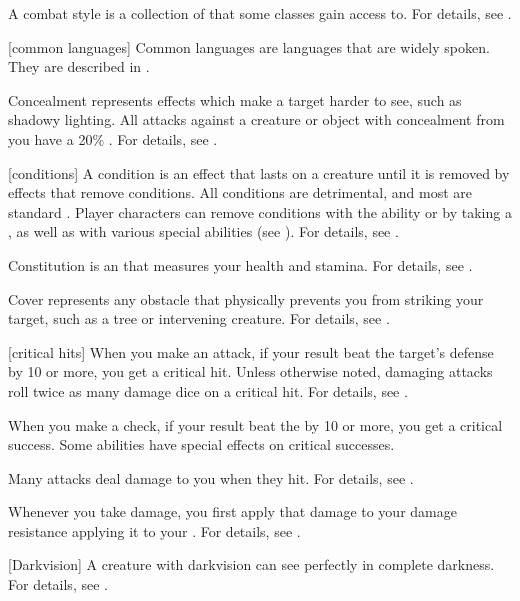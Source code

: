  A combat style is a collection of  that some classes gain access to.
For details, see .

[common languages] Common languages are languages that are widely spoken.
They are described in .

 Concealment represents effects which make a target harder to see, such as shadowy lighting.
All  attacks against a creature or object with concealment from you have a 20\% .
For details, see .

[conditions] A condition is an effect that lasts on a creature until it is removed by effects that remove conditions.
All conditions are detrimental, and most are standard .
Player characters can remove conditions with the  ability or by taking a , as well as with various special abilities (see ).
For details, see .

 Constitution is an  that measures your health and stamina.
For details, see .

 Cover represents any obstacle that physically prevents you from striking your target, such as a tree or intervening creature.
For details, see .

[critical hits] When you make an attack, if your result beat the target's defense by 10 or more, you get a critical hit.
Unless otherwise noted, damaging attacks roll twice as many damage dice on a critical hit.
For details, see .

 When you make a check, if your result beat the  by 10 or more, you get a critical success.
Some abilities have special effects on critical successes.

 Many attacks deal damage to you when they hit.
For details, see .

 Whenever you take damage, you first apply that damage to your damage resistance applying it to your .
For details, see .

[Darkvision] A creature with darkvision can see perfectly in complete darkness.
For details, see .

